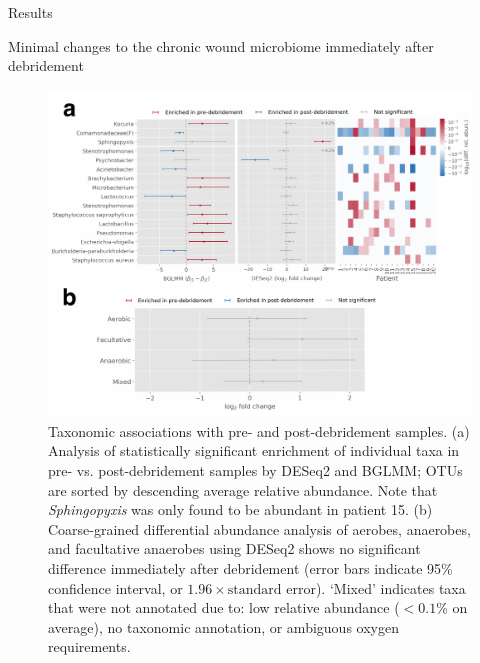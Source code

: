 \documentclass[oneside,12pt,final]{sty/ucthesis-CA2012}
\begin{document}
\begin{mainmatter}
\begin{section}{Results}
\begin{subsection}{Minimal changes to the chronic wound microbiome immediately after debridement}
\begin{figure}
\centering
\centerline{\includegraphics[width=\textwidth]{fig/C3fig3CD}}
\caption{Taxonomic associations with pre- and post-debridement samples. (a) Analysis of statistically significant enrichment of individual taxa in pre- vs. post-debridement samples by DESeq2 and BGLMM; OTUs are sorted by descending average relative abundance. Note that \textit{Sphingopyxis} was only found to be abundant in patient 15. (b) Coarse-grained differential abundance analysis of aerobes, anaerobes, and facultative anaerobes using DESeq2 shows no significant difference immediately after debridement (error bars indicate 95\% confidence interval, or $1.96 \times \text{standard error}$). ‘Mixed’ indicates taxa that were not annotated due to: low relative abundance ($<0.1$\% on average), no taxonomic annotation, or ambiguous oxygen requirements.}
\label{fig:fig3cd}
\end{figure}
\end{subsection}


\end{section}
\end{mainmatter}
\end{document}
